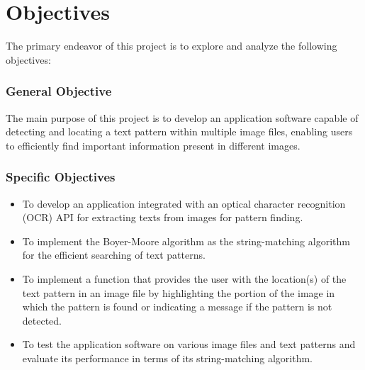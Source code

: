 \part{Objectives}

The primary endeavor of this project is to explore and analyze the following objectives:

\section*{General Objective}
\hspace\parindent
The main purpose of this project is to develop an application software capable of detecting and locating a text pattern within multiple image files, enabling users to efficiently find important information present in different images. 

\section*{Specific Objectives}
\begin{itemize}
    \item To develop an application integrated with an optical character recognition (OCR) API for extracting texts from images for pattern finding.
    \item To implement the Boyer-Moore algorithm as the string-matching algorithm for the efficient searching of text patterns.
    \item To implement a function that provides the user with the location(s) of the text pattern in an image file by highlighting the portion of the image in which the pattern is found or indicating a message if the pattern is not detected.
    \item To test the application software on various image files and text patterns and evaluate its performance in terms of its string-matching algorithm.
\end{itemize}

